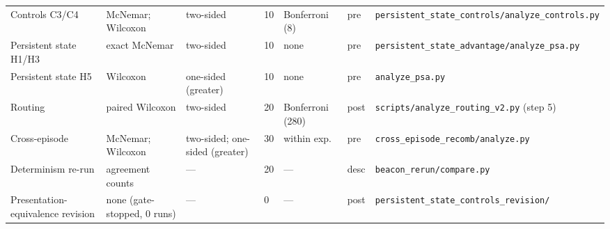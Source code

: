 \documentclass[fleqn,10pt]{wlpeerj}
\begin{document}
\begin{table}[h]
\begin{tabular}{L{2.5cm}L{2.5cm}L{2.4cm}L{0.7cm}L{1.8cm}L{0.7cm}L{3.4cm}}
Controls C3/C4 & McNemar; Wilcoxon & two-sided & 10 & Bonferroni (8) & pre & \texttt{persistent\_state\_\allowbreak controls/\allowbreak analyze\_controls.py} \\
Persistent state H1/H3 & exact McNemar & two-sided & 10 & none & pre & \texttt{persistent\_state\_\allowbreak advantage/\allowbreak analyze\_psa.py} \\
Persistent state H5 & Wilcoxon & one-sided (greater) & 10 & none & pre & \texttt{analyze\_psa.py} \\
Routing & paired Wilcoxon & two-sided & 20 & Bonferroni (280) & post & \texttt{scripts/\allowbreak analyze\_routing\_v2.py} (step 5) \\
Cross-episode & McNemar; Wilcoxon & two-sided; one-sided (greater) & 30 & within exp. & pre & \texttt{cross\_episode\_\allowbreak recomb/\allowbreak analyze.py} \\
Determinism re-run & agreement counts & --- & 20 & --- & desc & \texttt{beacon\_rerun/compare.py} \\
Presentation-equivalence revision & none (gate-stopped, 0 runs) & --- & 0 & --- & post & \texttt{persistent\_state\_\allowbreak controls\_\allowbreak revision/} \\
\bottomrule
\end{tabular}
\end{table}
\end{document}
